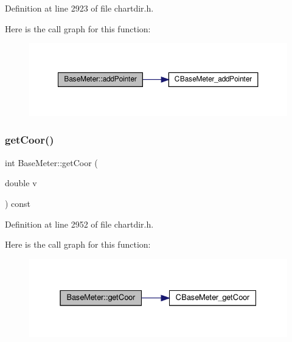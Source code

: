 Definition at line 2923 of file chartdir.\+h.

Here is the call graph for this function\+:
\nopagebreak
\begin{figure}[H]
\begin{center}
\leavevmode
\includegraphics[width=350pt]{class_base_meter_afa1ed46d9fd3dfc852d170338929795f_cgraph}
\end{center}
\end{figure}
\mbox{\label{class_base_meter_af6703e71691837360f4f3d408730c7d7}} 
\subsubsection{\texorpdfstring{get\+Coor()}{getCoor()}}
{\footnotesize\ttfamily int Base\+Meter\+::get\+Coor (\begin{DoxyParamCaption}\item[{double}]{v }\end{DoxyParamCaption}) const\hspace{0.3cm}{\ttfamily [inline]}}



Definition at line 2952 of file chartdir.\+h.

Here is the call graph for this function\+:
\nopagebreak
\begin{figure}[H]
\begin{center}
\leavevmode
\includegraphics[width=331pt]{class_base_meter_af6703e71691837360f4f3d408730c7d7_cgraph}
\end{center}
\end{figure}
\mbox{\label{class_base_meter_a2cbaf32dcf5bbec04d4e1ec52091692a}} 
